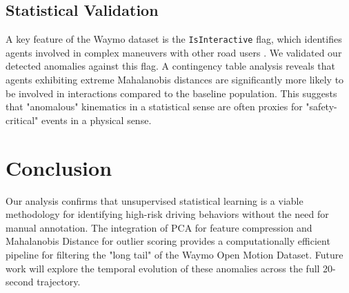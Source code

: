 \documentclass[conference]{IEEEtran}
\begin{document}
\subsection{Statistical Validation}
A key feature of the Waymo dataset is the \texttt{IsInteractive} flag, which identifies agents involved in complex maneuvers with other road users \cite{ettinger2021waymo}. We validated our detected anomalies against this flag. A contingency table analysis reveals that agents exhibiting extreme Mahalanobis distances are significantly more likely to be involved in interactions compared to the baseline population. This suggests that "anomalous" kinematics in a statistical sense are often proxies for "safety-critical" events in a physical sense.

\section{Conclusion}
Our analysis confirms that unsupervised statistical learning is a viable methodology for identifying high-risk driving behaviors without the need for manual annotation. The integration of PCA for feature compression and Mahalanobis Distance for outlier scoring provides a computationally efficient pipeline for filtering the "long tail" of the Waymo Open Motion Dataset. Future work will explore the temporal evolution of these anomalies across the full 20-second trajectory.



\end{document}
